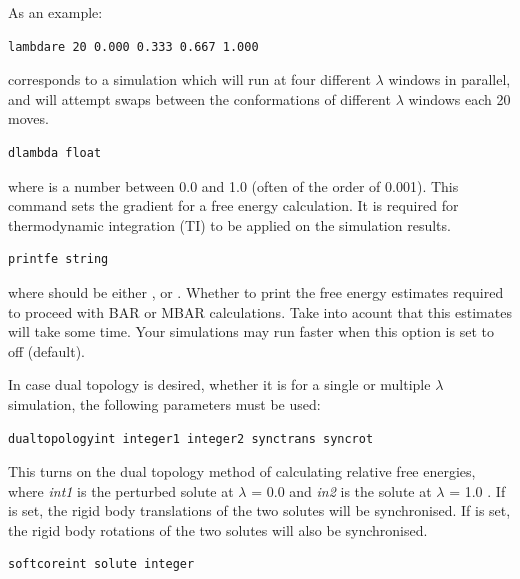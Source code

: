 \documentclass[letterpaper,10pt,english]{sphinxmanual}
\begin{document}
As an example:

\begin{Verbatim}[commandchars=\\\{\}]
lambdare 20 0.000 0.333 0.667 1.000
\end{Verbatim}

corresponds to a simulation which will run at four different \(\lambda\) windows in parallel, and will attempt swaps between the conformations of different \(\lambda\) windows each 20 moves.

\begin{Verbatim}[commandchars=\\\{\}]
dlambda float
\end{Verbatim}

where  is a number between 0.0 and 1.0 (often of the order of 0.001). This command sets the gradient for a free energy calculation. It is required for thermodynamic integration (TI) to be applied on the simulation results.

\begin{Verbatim}[commandchars=\\\{\}]
printfe string
\end{Verbatim}

where  should be either ,  or . Whether to print the free energy estimates required to proceed with BAR or MBAR calculations. Take into acount that this estimates will take some time. Your simulations may run faster when this option is set to off (default).

In case dual topology is desired, whether it is for a single or multiple \(\lambda\) simulation, the following parameters must be used:

\begin{Verbatim}[commandchars=\\\{\}]
dualtopologyint integer1 integer2 synctrans syncrot
\end{Verbatim}

This turns on the dual topology method of calculating relative free energies, where \emph{int1} is the perturbed solute at \(\lambda\) = 0.0 and \emph{in2} is the solute at \(\lambda\) = 1.0 . If  is set, the rigid body translations of the two solutes will be synchronised. If  is set, the rigid body rotations of the two solutes will also be synchronised.

\begin{Verbatim}[commandchars=\\\{\}]
softcoreint solute integer
\end{Verbatim}
\end{document}
